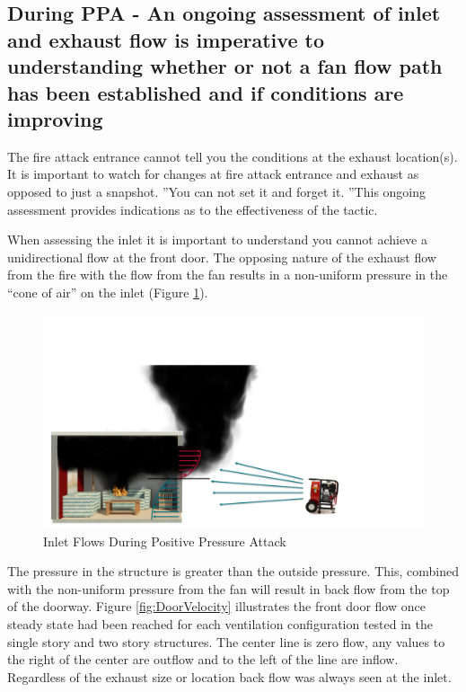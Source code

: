 \documentclass{article}
\begin{document}
\subsection{During PPA - An ongoing assessment of inlet and exhaust flow is imperative to understanding whether or not a fan flow path has been established and if conditions are improving} \label{sec:OngoingAssessment}
The fire attack entrance cannot tell you the conditions at the exhaust location(s). It is important to watch for changes at fire attack entrance and exhaust as opposed to just a snapshot. ''You can not set it and forget it. ''This ongoing assessment provides indications as to the effectiveness of the tactic. 

When assessing the inlet it is important to understand you cannot achieve a unidirectional flow at the front door. The opposing nature of the exhaust flow from the fire with the flow from the fan results in a non-uniform pressure in the “cone of air” on the inlet (Figure \ref{fig:FanAndDoorFlow}).

\begin{figure}[H]
	\centering
	\includegraphics[width = 6in]{0_Images/Tactical_Considerations/Ongoing_Assessment/FanandDoorFlow.pdf}
	\caption{Inlet Flows During Positive Pressure Attack}
	\label{fig:FanAndDoorFlow}
\end{figure}

The pressure in the structure is greater than the outside pressure. This, combined with the non-uniform pressure from the fan will result in back flow from the top of the doorway. Figure \ref{fig:DoorVelocity} illustrates the front door flow once steady state had been reached for each ventilation configuration tested in the single story and two story structures. The center line is zero flow, any values to the right of the center are outflow and to the left of the line are inflow. Regardless of the exhaust size or location back flow was always seen at the inlet.
\end{document}
